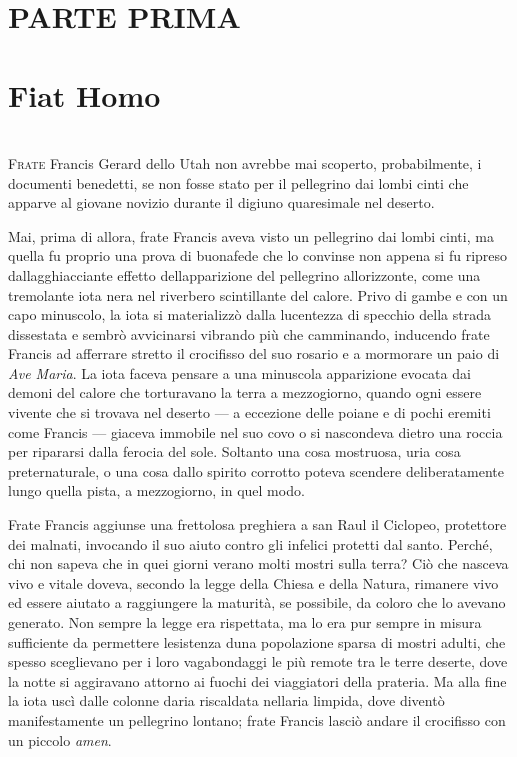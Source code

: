 \mainmatter
{ \chapter*{PARTE PRIMA\\\leavevmode\\\footnotesize{Fiat Homo}}}

\chapter{\phantom{text}}

\lettrine{F}{rate} Francis Gerard dello Utah non avrebbe mai scoperto, probabilmente,
i documenti benedetti, se non fosse stato per il pellegrino dai lombi
cinti che apparve al giovane novizio durante il digiuno quaresimale nel
deserto.

Mai, prima di allora, frate Francis aveva visto un pellegrino dai lombi
cinti, ma quella fu proprio una prova di buonafede che lo convinse non
appena si fu ripreso dall\textquotesingle agghiacciante effetto
dell\textquotesingle apparizione del pellegrino
all\textquotesingle orizzonte, come una tremolante iota nera nel
riverbero scintillante del calore. Privo di gambe e con un capo
minuscolo, la iota si materializzò dalla lucentezza di specchio della
strada dissestata e sembrò avvicinarsi vibrando più che camminando,
inducendo frate Francis ad afferrare stretto il crocifisso del suo
rosario e a mormorare un paio di \emph{Ave Maria}. La iota faceva
pensare a una minuscola apparizione evocata dai demoni del calore che
torturavano la terra a mezzogiorno, quando ogni essere vivente che si
trovava nel deserto --- a eccezione delle poiane e di pochi eremiti come
Francis --- giaceva immobile nel suo covo o si nascondeva dietro una
roccia per ripararsi dalla ferocia del sole. Soltanto una cosa
mostruosa, uria cosa preternaturale, o una cosa dallo spirito corrotto
poteva scendere deliberatamente lungo quella pista, a mezzogiorno, in
quel modo.

Frate Francis aggiunse una frettolosa preghiera a san Raul il Ciclopeo,
protettore dei malnati, invocando il suo aiuto contro gli infelici
protetti dal santo. Perché, chi non sapeva che in quei giorni
v\textquotesingle erano molti mostri sulla terra? Ciò che nasceva vivo e
vitale doveva, secondo la legge della Chiesa e della Natura, rimanere
vivo ed essere aiutato a raggiungere la maturità, se possibile, da
coloro che lo avevano generato. Non sempre la legge era rispettata, ma
lo era pur sempre in misura sufficiente da permettere
l\textquotesingle esistenza d\textquotesingle una popolazione sparsa di
mostri adulti, che spesso sceglievano per i loro vagabondaggi le più
remote tra le terre deserte, dove la notte si aggiravano attorno ai
fuochi dei viaggiatori della prateria. Ma alla fine la iota uscì dalle
colonne d\textquotesingle aria riscaldata nell\textquotesingle aria
limpida, dove diventò manifestamente un pellegrino lontano; frate
Francis lasciò andare il crocifisso con un piccolo \emph{amen}.

